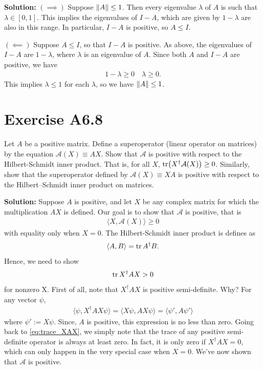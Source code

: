 \documentclass{book}
\newcommand{\mc}[1]{\mathcal{#1}}
\begin{document}
    \textbf{Solution:} $(\implies)$ Suppose $\norm{A}\leq 1$. Then every eigenvalue $\lambda$ of $A$ is such that $\lambda \in [0,1]$. This implies the eigenvalues of $I-A$, which are given by $1-\lambda$ are also in this range. In particular, $I-A$ is positive, so $A\leq I$.
    
    $(\impliedby)$ Suppose $A\leq I$, so that $I-A$ is positive. As above, the eigenvalues of $I-A$ are $1-\lambda$, where $\lambda$ is an eigenvalue of $A$. Since both $A$ and $I-A$ are positive, we have
    \begin{align}
        1-\lambda \geq 0 \quad \lambda \geq 0.
    \end{align}
    This implies $\lambda \leq 1$ for each $\lambda$, so we have $\norm{A}\leq 1$.

\section*{Exercise A6.8}
    Let $A$ be a positive matrix. Define a superoperator (linear operator on matrices) by the equation $\mc{A}(X) \equiv A X$. Show that $\mc{A}$ is positive with respect to the Hilbert-Schmidt inner product. That is, for all $X$, $\tr(X^\dagger \mc{A}(X)) \geq 0$. Similarly, show that the superoperator defined by $\mc{A} (X) \equiv XA$ is positive with respect to the Hilbert–Schmidt inner product on matrices.
    
    \textbf{Solution:} Suppose $A$ is positive, and let $X$ be any complex matrix for which the multiplication $AX$ is defined. Our goal is to show that $\mc{A}$ is positive, that is
    \begin{align} \label{eq:trace_XAX}
        \langle X, \mc{A}(X)\rangle \geq 0
    \end{align}
    with equality only when $X = 0$. The Hilbert-Schmidt inner product is defines as
    \begin{align}
        \langle A, B \rangle = \tr A^\dagger B.
    \end{align}
    Hence, we need to show
    \begin{align}
        \tr X^\dagger A X > 0
    \end{align}
    for nonzero X. First of all, note that $X^\dagger A X$ is positive semi-definite. Why? For any vector $\psi$,
    \begin{align}
        \langle \psi, X^\dagger A X \psi \rangle = \langle X \psi, A X \psi \rangle = \langle \psi', A \psi'\rangle
    \end{align}
    where $\psi' := X \psi$. Since, $A$ is positive, this expression is no less than zero. Going back to \eqref{eq:trace_XAX}, we simply note that the trace of any positive semi-definite operator is always at least zero. In fact, it is only zero if $X^\dagger A X = 0$, which can only happen in the very special case when $X = 0$. We've now shown that $\mc{A}$ is positive.
\end{document}
